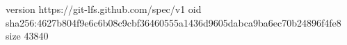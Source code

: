 version https://git-lfs.github.com/spec/v1
oid sha256:4627b804f9e6c6b08c9cbf36460555a1436d9605dabca9ba6ec70b24896f4fe8
size 43840
